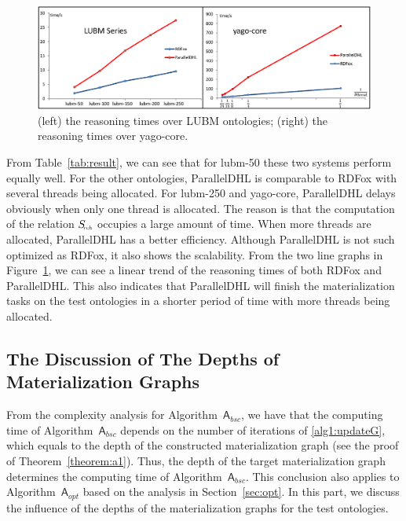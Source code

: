 \begin{figure}[htbp]
\begin{center}
\includegraphics[width=1\textwidth]{fig-reasoningtime.eps}
\caption{(left) the reasoning times over LUBM ontologies; (right) the reasoning times over yago-core.}
\label{fig:reasoningtime}
\end{center}
\end{figure}

From Table~\ref{tab:result}, we can see that for lubm-50 these two systems perform equally well.
For the other ontologies, ParallelDHL is comparable to RDFox with several threads being allocated.
For lubm-250 and yago-core, ParallelDHL delays obviously when only one thread is allocated.
The reason is that the computation of the relation $S_{\textit{\!\tiny rch}}$ occupies a large amount of time. When
more threads are allocated, ParallelDHL has a better efficiency.
Although ParallelDHL is not such optimized as RDFox, it also shows the scalability.
From the two line graphs in Figure~\ref{fig:reasoningtime},
we can see a linear trend of the reasoning times of both RDFox and ParallelDHL.
This also indicates that ParallelDHL will finish the materialization tasks on the test ontologies
in a shorter period of time with more threads being allocated.

\subsection{The Discussion of The Depths of Materialization Graphs}

From the complexity analysis for Algorithm~$\mathsf{A}_{bsc}$, we have that the computing time of
Algorithm~$\mathsf{A}_{bsc}$ depends on the number of iterations of \ref{alg1:updateG},
which equals to the depth of the constructed materialization graph (see the proof of Theorem~\ref{theorem:a1}).
Thus, the depth of the target materialization graph determines the computing time of
Algorithm~$\mathsf{A}_{bsc}$. This conclusion also applies to Algorithm~$\mathsf{A}_{opt}$
based on the analysis in Section~\ref{sec:opt}. In this part,
we discuss the influence of the depths of the materialization graphs
for the test ontologies.

